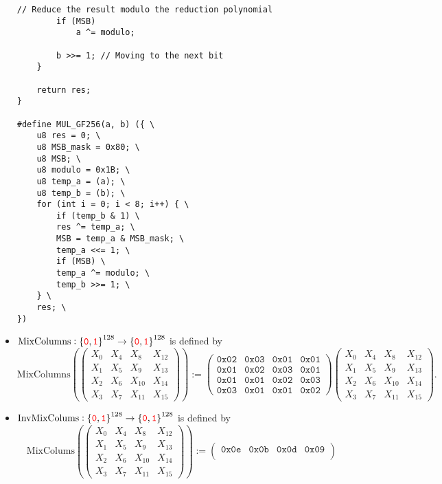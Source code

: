 \begin{itemize}
\begin{lstlisting}[style=C, caption={Multiplication in GF($2^8$)},captionpos=t]
		// Reduce the result modulo the reduction polynomial
		if (MSB)
			a ^= modulo;
		
		b >>= 1; // Moving to the next bit
	}
	
	return res;
}

#define MUL_GF256(a, b) ({ \
	u8 res = 0; \
	u8 MSB_mask = 0x80; \
	u8 MSB; \
	u8 modulo = 0x1B; \
	u8 temp_a = (a); \
	u8 temp_b = (b); \
	for (int i = 0; i < 8; i++) { \
		if (temp_b & 1) \
		res ^= temp_a; \
		MSB = temp_a & MSB_mask; \
		temp_a <<= 1; \
		if (MSB) \
		temp_a ^= modulo; \
		temp_b >>= 1; \
	} \
	res; \
})
	\end{lstlisting}
	\newpage
	\item $\text{MixColumns}:\set{\textcolor{red}{\texttt{0}},\textcolor{red}{\texttt{1}}}^{128}\to\set{\textcolor{red}{\texttt{0}},\textcolor{red}{\texttt{1}}}^{128}$ is defined by \[
	\text{MixColumns}\left(\begin{pmatrix}
		X_0 & X_4 & X_8 & X_{12} \\
		X_1 & X_5 & X_9 & X_{13} \\
		X_2 & X_6 & X_{10} & X_{14} \\
		X_3 & X_7 & X_{11} & X_{15}
	\end{pmatrix}\right):=\begin{pmatrix}
		\texttt{0x02} & \texttt{0x03} & \texttt{0x01} & \texttt{0x01}\\
		\texttt{0x01} & \texttt{0x02} & \texttt{0x03} & \texttt{0x01}\\
		\texttt{0x01} & \texttt{0x01} & \texttt{0x02} & \texttt{0x03}\\
		\texttt{0x03} & \texttt{0x01} & \texttt{0x01} & \texttt{0x02}
	\end{pmatrix}\begin{pmatrix}
		X_0 & X_4 & X_8 & X_{12} \\
		X_1 & X_5 & X_9 & X_{13} \\
		X_2 & X_6 & X_{10} & X_{14} \\
		X_3 & X_7 & X_{11} & X_{15}
		\end{pmatrix}.
	\]
	\item $\text{InvMixColums}:\set{\textcolor{red}{\texttt{0}},\textcolor{red}{\texttt{1}}}^{128}\to\set{\textcolor{red}{\texttt{0}},\textcolor{red}{\texttt{1}}}^{128}$ is defined by \[
	\text{MixColums}\left(\begin{pmatrix}
		X_0 & X_4 & X_8 & X_{12} \\
		X_1 & X_5 & X_9 & X_{13} \\
		X_2 & X_6 & X_{10} & X_{14} \\
		X_3 & X_7 & X_{11} & X_{15}
	\end{pmatrix}\right):=\begin{pmatrix}
		\texttt{0x0e} & \texttt{0x0b} & \texttt{0x0d} & \texttt{0x09}\\

\end{pmatrix}\]
\end{itemize}
